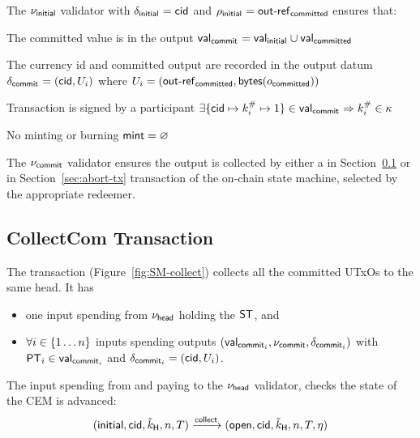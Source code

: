 \noindent The $\nu_{\mathsf{initial}}$ validator with $\delta_{\mathsf{initial}_{}} = \mathsf{cid}$ and $\rho_{\mathsf{initial}_{}} = \mathsf{out\textsf{-}{}ref}_{\mathsf{committed}}$ ensures that:
\begin{menumerate}
  \item The committed value is in the output $\mathsf{val}_{\mathsf{commit}_{}} = \mathsf{val}_{\mathsf{initial}_{}} \cup \mathsf{val}_{\mathsf{committed}}$
  \item The currency id and committed output are recorded in the output datum
  $\delta_{\mathsf{commit}_{}} = (\mathsf{cid}, U_{i})$ where
  $U_{i} = (\mathsf{out\textsf{-}{}ref}_{\mathsf{committed}},\mathsf{bytes}(o_{\mathsf{committed}}))$
  \item Transaction is signed by a participant $\exists \{\mathsf{cid} \mapsto k^{\#}_{i} \mapsto 1\} \in \mathsf{val}_{\mathsf{commit}_{}} \Rightarrow k^{\#}_{i} \in \kappa$
  \item No minting or burning  $\mathsf{mint} = \varnothing$
\end{menumerate}

\noindent The $\nu_{\mathsf{commit}}$ validator ensures the output is collected by either a \mtxCCom{} in Section~\ref{sec:collect-tx} or \mtxAbort{} in Section~\ref{sec:abort-tx} transaction of the on-chain state machine, selected by the appropriate redeemer.

\subsection{CollectCom Transaction}\label{sec:collect-tx}

\noindent The \mtxCCom{} transaction (Figure~\ref{fig:SM-collect}) collects all the committed UTxOs to the same head. It has
\begin{itemize}
  \item one input spending from $\nu_\mathsf{head}$ holding the $\mathsf{ST}$, and
  \item $\forall i \in \{1 \dots n\}$ inputs spending \mtxCom{} outputs $(\mathsf{val}_{\mathsf{commit}_{i}}, \nu_{\mathsf{commit}}, \delta_{\mathsf{commit}_{i}})$ with $\mathsf{PT}_{i} \in \mathsf{val}_{\mathsf{commit}_{i}}$ and $\delta_{\mathsf{commit}_{i}} = (\mathsf{cid}, U_{i})$.
\end{itemize}

\noindent The input spending from and paying to the $\nu_\mathsf{head}$ validator, checks the state
of the CEM is advanced:
\[
   (\mathsf{initial},\mathsf{cid},\tilde{k}_{\mathsf{H}},n,T) \xrightarrow{\mathsf{collect}} (\mathsf{open},\mathsf{cid},\tilde{k}_{\mathsf{H}},n,T,\eta)
\]

